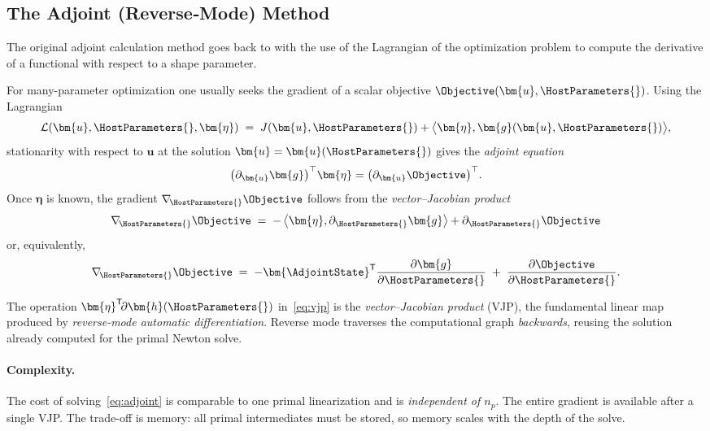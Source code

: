 
\subsection{The Adjoint (Reverse‐Mode) Method} \label{sec:adjoint}

The original adjoint calculation method goes back to \cite{cea1986conception} with the use of the Lagrangian of the optimization
problem to compute the derivative of a functional with respect to a shape parameter.


For many-parameter optimization one usually seeks the gradient of a scalar
objective $\Objective(\bm{u},\HostParameters{})$. 
Using the Lagrangian
%
\[
  \mathcal{L}(\bm{u},\HostParameters{},\bm{\eta})
  \;=\;
  J(\bm{u},\HostParameters{})
  +\bigl\langle\bm{\eta},\bm{g}(\bm{u},\HostParameters{})\bigr\rangle,
\]
%
stationarity with respect to $\bm{u}$ at the solution
$\bm{u}=\bm{u}(\HostParameters{})$ gives the \emph{adjoint equation}
%
\begin{equation}\label{eq:adjoint}
  \bigl(\partial_{\bm{u}}\bm{g}\bigr)^{\top}\bm{\eta}
  =
  \bigl(\partial_{\bm{u}} \Objective \bigr)^{\top} .
\end{equation}
%
Once $\bm{\eta}$ is known, the gradient
$\nabla_{\!\HostParameters{}} \Objective$ follows from the \emph{vector–Jacobian product}
%
\begin{equation}\label{eq:vjp}
  \nabla_{\!\HostParameters{}} \Objective
  \;=\;
  -\,\bigl\langle\bm{\eta},\partial_{\HostParameters{}}\bm{g}\bigr\rangle
  +\partial_{\HostParameters{}} \Objective
\end{equation}
or, equivalently,
\begin{equation}\label{eq:grad}
\nabla_{\!\HostParameters{}} \Objective
\;=\;
-\bm{\AdjointState}^{\mathsf{T}}
\frac{\partial\bm{g}}{\partial\HostParameters{}}
\;+\;
\frac{\partial \Objective}{\partial\HostParameters{}} .
\end{equation}


The operation
$\bm{\eta}^{\mathsf{T}}\!\partial\bm{h}(\HostParameters{})$ in~\eqref{eq:vjp} is the
\emph{vector–Jacobian product} (VJP), the fundamental linear map produced by
\emph{reverse-mode automatic differentiation}.
Reverse mode traverses the computational graph \emph{backwards}, reusing the
solution already computed for the primal Newton solve.

\paragraph{Complexity.}
The cost of solving~\eqref{eq:adjoint} is comparable to one primal
linearization and is \emph{independent of $n_p$}.  
The entire gradient is available after a single VJP.  
The trade-off is memory: all primal
intermediates must be stored, so memory
scales with the depth of the solve.

